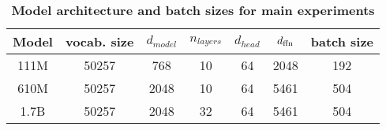 \begin{table}
  \centering
  \caption{\textbf{Model architecture and batch sizes for main experiments}\label{tab:model_info}}
\begin{tabular}{@{}ccccccc@{}}
\toprule
Model & vocab. size & $d_{model}$ & $n_{layers}$ & $d_{head}$ & $d_{\text{ffn}}$ & batch size \\ \midrule
111M  & 50257       & 768         & 10           & 64         & 2048    & 192        \\
610M  & 50257       & 2048        & 10           & 64         & 5461    & 504        \\
1.7B  & 50257       & 2048        & 32           & 64         & 5461    & 504        \\ \bottomrule
\end{tabular}
\end{table}
